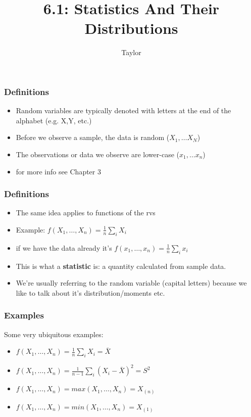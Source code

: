 \documentclass{beamer}
\title["6.1"]{6.1: Statistics And Their Distributions} %
\author{Taylor} %
\institute[UVA] %
{
University of Virginia \\ %
\medskip
\textit{} %
}
\date{} %
\begin{document}

\begin{frame}
\titlepage 
\end{frame}

\begin{frame}
\frametitle{Definitions}

\begin{itemize}
\item Random variables are typically denoted with letters at the end of the alphabet (e.g. X,Y, etc.)
\item Before we observe a sample, the data is random ($X_1 , \ldots X_N$)
\item The observations or data we observe are lower-case ($x_1, \ldots x_n$)
\item for more info see Chapter 3
\end{itemize}

\end{frame}

\begin{frame}
\frametitle{Definitions}

\begin{itemize}
\item The same idea applies to functions of the rvs 
\item Example: $f(X_1, \ldots, X_n) = \frac{1}{n}\sum_i X_i$ 
\item if we have the data already it's $f(x_1, \ldots, x_n) = \frac{1}{n}\sum_i x_i$
\item This is what a \textbf{statistic} is: a quantity calculated from sample data.
\item We're usually referring to the random variable (capital letters) because we like to talk about it's distribution/moments etc.
\end{itemize}

\end{frame}

\begin{frame}
\frametitle{Examples}

Some very ubiquitous examples:

\begin{itemize}
\item $f(X_1, \ldots, X_n) = \frac{1}{n}\sum_i X_i = \bar{X}$ 
\item $f(X_1, \ldots, X_n) = \frac{1}{n-1}\sum_i (X_i - \bar{X})^2 = S^2$
\item $f(X_1, \ldots, X_n) = max(X_1, \ldots, X_n) = X_{(n)} $
\item $f(X_1, \ldots, X_n) = min(X_1, \ldots, X_n) = X_{(1)} $
\end{itemize}
\end{frame}
\end{document}
